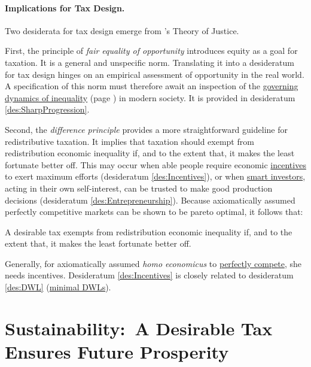 \paragraph{Implications for Tax Design.}
Two desiderata for tax design emerge from \citeauthor{Rawls-1971}'s Theory of Justice.

First, the principle of \emph{fair equality of opportunity} introduces equity as a goal for taxation.
It is a general and unspecific norm.
Translating it into a desideratum for tax design hinges on an empirical assessment of  opportunity
 in the real world.
A specification of this norm must therefore await an inspection of the \hyperref[sec:GovDynofIneq]{governing dynamics of inequality} (page \pageref{sec:GovDynofIneq}) in modern society.
It is provided in desideratum \ref{des:SharpProgression}.

Second, the \emph{difference principle} provides a more straightforward guideline for redistributive taxation.
It implies that taxation should exempt from redistribution economic inequality if, and to the extent that, it makes the least fortunate better off.
This may occur when able people require economic \hyperref[des:Incentives]{incentives} to exert maximum efforts (desideratum \ref{des:Incentives}), or when \hyperref[des:Entrepreneurship]{smart investors}, acting in their own self-interest, can be trusted to make good production decisions (desideratum \ref{des:Entrepreneurship}).
Because axiomatically assumed perfectly competitive markets can be shown to be pareto optimal, it follows that:

\begin{desideratum}
	A desirable tax exempts from redistribution economic inequality if, and to the extent that, it makes the least fortunate better off.
	\label{des:DifferencePrinciple}
\end{desideratum}

Generally, for axiomatically assumed \emph{homo economicus} to \hyperref[sec:PerfectCompetition]{perfectly compete}, she needs incentives.
Desideratum \ref{des:Incentives} is closely related to desideratum \ref{des:DWL} (\hyperref[des:DWL]{minimal DWLs}).


\section[Sustainability]{Sustainability:~A Desirable Tax Ensures Future Prosperity} \label{sec:tax-sustainability}%

